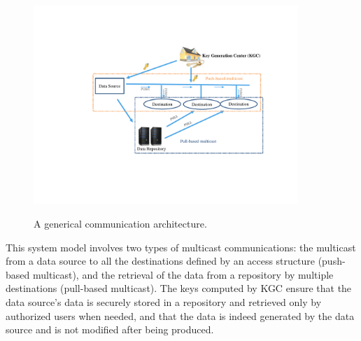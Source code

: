 \documentclass[letterpaper,12pt]{article}
\begin{document}
\begin{figure}[!htp]
\centering
 \includegraphics[width=10cm]{framework}\\
 \centering \caption{A generical communication architecture.}\label{Fig1:architecture}
\end{figure}

This system model involves two types of multicast communications: the multicast from a data source to all the destinations defined by an access structure (push-based multicast), and the retrieval of the data from a repository by multiple destinations (pull-based multicast).  The keys computed by KGC ensure that the data source's data is securely stored in a repository and retrieved only by authorized users when needed, and that the data is indeed generated by the data source and is not modified after being produced.
\end{document}
